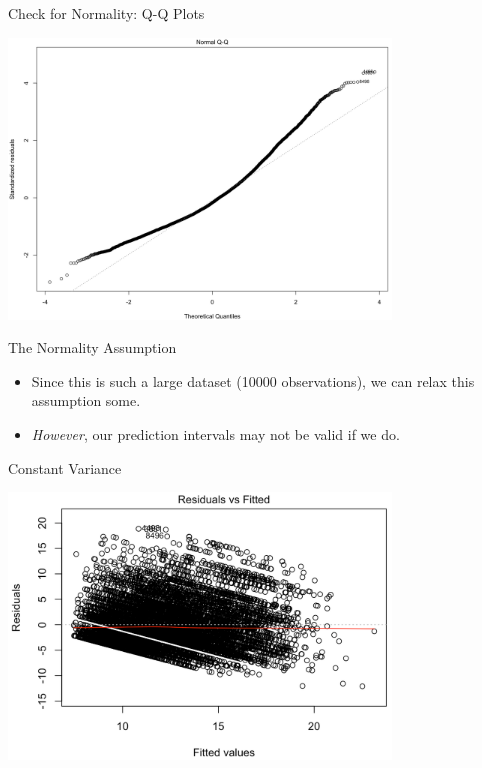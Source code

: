 \begin{frame}{Check for Normality: Q-Q Plots}
    \begin{center}
        \includegraphics[width=4in]{images/qqmultreg.png}
    \end{center}
\end{frame}

\begin{frame}{The Normality Assumption}
    \begin{itemize}
        \item Since this is such a large dataset (10000 observations), we can relax this assumption some.
        \item \textit{However}, our prediction intervals may not be valid if we do. 
    \end{itemize}
\end{frame}

\begin{frame}{Constant Variance}
    \begin{center}
        \includegraphics[width=4in]{images/multregconstvar.png}
    \end{center}
\end{frame}


